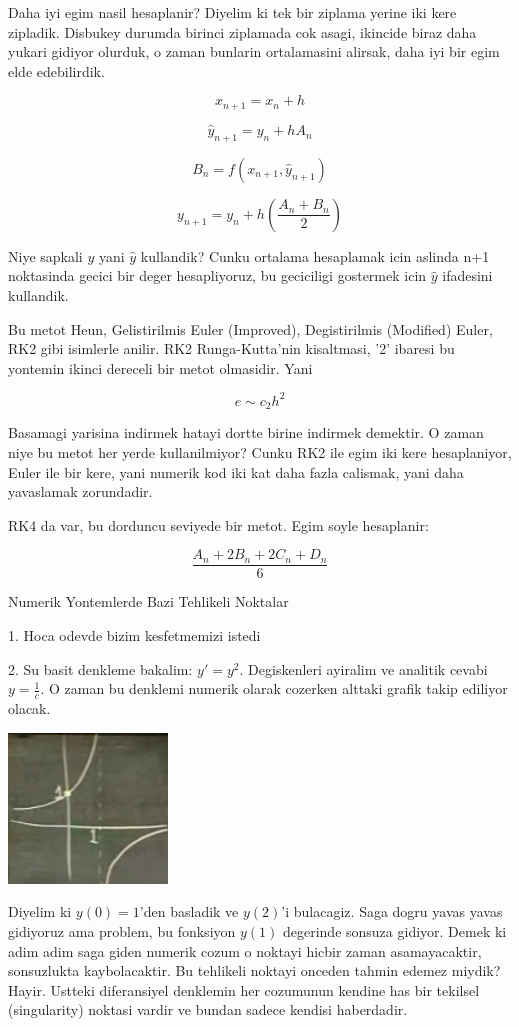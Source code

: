 \documentclass[12pt,fleqn]{article}
\begin{document}
Daha iyi egim nasil hesaplanir? Diyelim ki tek bir ziplama yerine iki kere
zipladik. Disbukey durumda birinci ziplamada cok asagi, ikincide biraz daha
yukari gidiyor olurduk, o zaman bunlarin ortalamasini alirsak, daha iyi bir egim
elde edebilirdik. 

\[ x_{n+1} = x_n + h \]

\[ \hat{y}_{n+1} = y_n + h A_n \]

\[ B_n = f(x_{n+1},\hat{y}_{n+1}) \]

\[ y_{n+1} = y_n + h(\frac{A_n+B_n}{2}) \]

Niye sapkali $y$ yani $\hat{y}$ kullandik? Cunku ortalama hesaplamak icin
aslinda n+1 noktasinda gecici bir deger hesapliyoruz, bu geciciligi gostermek
icin $\hat{y}$ ifadesini kullandik.

Bu metot Heun, Gelistirilmis Euler (Improved), Degistirilmis (Modified) Euler, RK2
gibi isimlerle anilir. RK2 Runga-Kutta'nin kisaltmasi, '2' ibaresi bu yontemin
ikinci dereceli bir metot olmasidir. Yani 

\[ e \sim c_2 h^2 \]

Basamagi yarisina indirmek hatayi dortte birine indirmek demektir. O zaman niye
bu metot her yerde kullanilmiyor? Cunku RK2 ile egim iki kere hesaplaniyor,
Euler ile bir kere, yani numerik kod iki kat daha fazla calismak, yani daha
yavaslamak zorundadir. 

RK4 da var, bu dorduncu seviyede bir metot. Egim soyle hesaplanir:

\[ \frac{A_n + 2B_n + 2C_n + D_n}{6} \]

Numerik Yontemlerde Bazi Tehlikeli Noktalar

1. Hoca odevde bizim kesfetmemizi istedi

2. Su basit denkleme bakalim: $y' = y^2$. Degiskenleri ayiralim ve analitik cevabi
$y=\frac{1}{c}$. O zaman bu denklemi numerik olarak cozerken alttaki grafik
takip ediliyor olacak.

\includegraphics[height=4cm]{2_5.png}

Diyelim ki $y(0) = 1$'den basladik ve $y(2)$'i bulacagiz. Saga dogru yavas yavas
gidiyoruz ama problem, bu fonksiyon $y(1)$ degerinde sonsuza gidiyor. Demek ki
adim adim saga giden numerik cozum o noktayi hicbir zaman
asamayacaktir, sonsuzlukta kaybolacaktir. Bu tehlikeli noktayi onceden tahmin
edemez miydik? Hayir. Ustteki diferansiyel denklemin her cozumunun kendine has
bir tekilsel (singularity) noktasi vardir ve bundan sadece kendisi
haberdadir. 
\end{document}
